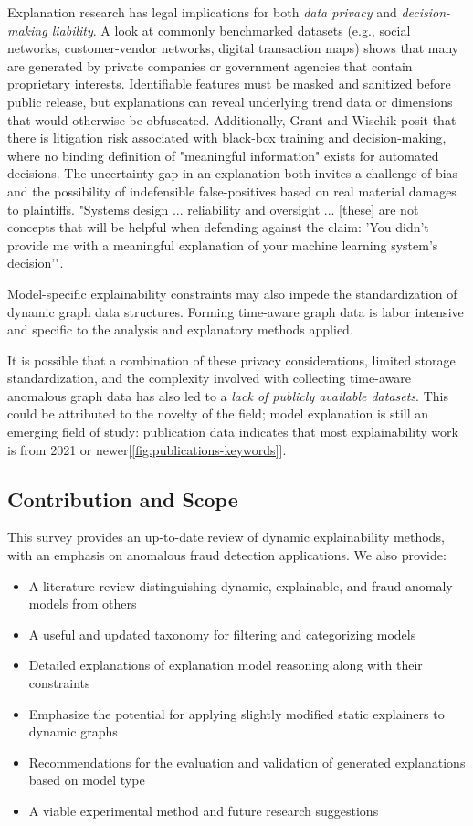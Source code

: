 Explanation research has legal implications for both \textit{data privacy} and \textit{decision-making liability}. A look at commonly benchmarked datasets (e.g., social networks, customer-vendor networks, digital transaction maps) shows that many are generated by private companies or government agencies that contain proprietary interests\cite{ma_comprehensive_2021}. Identifiable features must be masked and sanitized before public release, but explanations can reveal underlying trend data or dimensions that would otherwise be obfuscated. Additionally, Grant and Wischik posit that there is litigation risk associated with black-box training and decision-making, where no binding definition of "meaningful information" exists for automated decisions. The uncertainty gap in an explanation both invites a challenge of bias and the possibility of indefensible false-positives based on real material damages to plaintiffs. "Systems design ... reliability and oversight ... [these] are not concepts that will be helpful when defending against the claim: 'You didn't provide me with a meaningful explanation of your machine learning system's decision\cite{grant_show_2020}'".

Model-specific explainability constraints may also impede the standardization of dynamic graph data structures. Forming time-aware graph data is labor intensive and specific to the analysis and explanatory methods applied.

It is possible that a combination of these privacy considerations, limited storage standardization, and the complexity involved with collecting time-aware anomalous graph data has also led to a \textit{lack of publicly available datasets}. This could be attributed to the novelty of the field; model explanation is still an emerging field of study: publication data indicates that most explainability work is from 2021 or newer[\ref{fig:publications-keywords}].

\subsection{Contribution and Scope}
This survey provides an up-to-date review of dynamic explainability methods, with an emphasis on anomalous fraud detection applications. We also provide:
\begin{itemize} 
    \item A literature review distinguishing dynamic, explainable, and fraud anomaly models from others
    \item A useful and updated taxonomy for filtering and categorizing models
    \item Detailed explanations of explanation model reasoning along with their constraints
    \item Emphasize the potential for applying slightly modified static explainers to dynamic graphs
    \item Recommendations for the evaluation and validation of generated explanations based on model type
    \item A viable experimental method and future research suggestions
\end{itemize}

